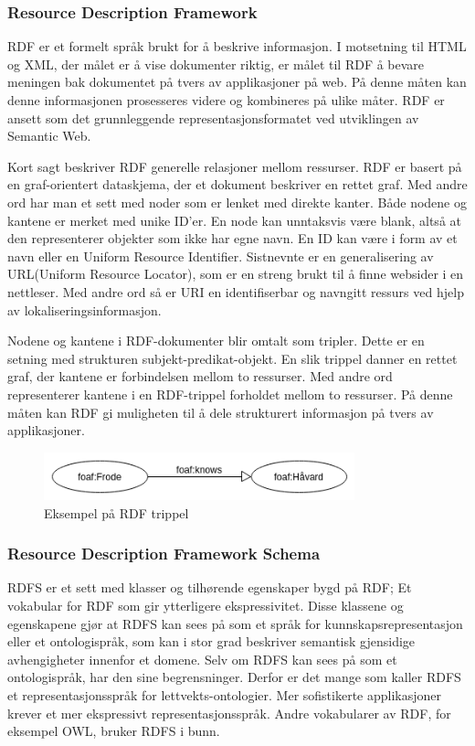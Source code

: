 \subsubsection{Resource Description Framework}
RDF er et formelt språk brukt for å beskrive informasjon. I motsetning til HTML og XML, der målet er å vise dokumenter riktig, er målet til RDF å bevare meningen bak dokumentet på tvers av applikasjoner på web. På denne måten kan denne informasjonen prosesseres videre og kombineres på ulike måter. RDF er ansett som det grunnleggende representasjonsformatet ved utviklingen av Semantic Web.

Kort sagt beskriver RDF generelle relasjoner mellom ressurser. RDF er basert på en graf-orientert dataskjema, der et dokument beskriver en rettet graf. Med andre ord har man et sett med noder som er lenket med direkte kanter. Både nodene og kantene er merket med unike ID'er. En node kan unntaksvis være blank, altså at den representerer objekter som ikke har egne navn. En ID kan være i form av et navn eller en Uniform Resource Identifier. Sistnevnte er en generalisering av URL(Uniform Resource Locator), som er en streng brukt til å finne websider i en nettleser. Med andre ord så er URI en identifiserbar og navngitt ressurs ved hjelp av lokaliseringsinformasjon.

Nodene og kantene i RDF-dokumenter blir omtalt som tripler. Dette er en setning med strukturen subjekt-predikat-objekt. En slik trippel danner en rettet graf, der kantene er forbindelsen mellom to ressurser. Med andre ord representerer kantene i en RDF-trippel forholdet mellom to ressurser. På denne måten kan RDF gi muligheten til å dele strukturert informasjon på tvers av applikasjoner.

\begin{figure}[H]
\centering
\includegraphics[width=90mm]{images/rdf_triple.png}
\caption{Eksempel på RDF trippel}
\end{figure}
\subsubsection{Resource Description Framework Schema}
RDFS er et sett med klasser og tilhørende egenskaper bygd på RDF; Et vokabular for RDF som gir ytterligere ekspressivitet. Disse klassene og egenskapene gjør at RDFS kan sees på som et språk for kunnskapsrepresentasjon eller et ontologispråk, som kan i stor grad beskriver semantisk gjensidige avhengigheter innenfor et domene. Selv om RDFS kan sees på som et ontologispråk, har den sine begrensninger. Derfor er det mange som kaller RDFS et representasjonsspråk for lettvekts-ontologier. Mer sofistikerte applikasjoner krever et mer ekspressivt representasjonsspråk. Andre vokabularer av RDF, for eksempel OWL, bruker RDFS i bunn. 


